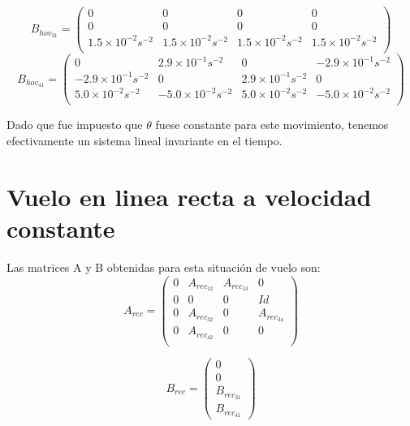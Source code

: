 \documentclass[main]{subfiles}
\begin{document}
\begin{equation}
B_{hov_{31}}=\left(\begin{array}{cccc}
0&0&0&0\\
0&0&0&0\\
1.5\times10^{-2}s^{-2} &1.5\times10^{-2}s^{-2} & 1.5\times10^{-2}s^{-2}& 1.5\times10^{-2}s^{-2} \\
\end{array}\right) 
\end{equation}
\begin{equation}
B_{hov_{41}}=\left(\begin{array}{cccc}
0 & 2.9\times10^{-1}s^{-2} & 0 &-2.9\times10^{-1}s^{-2} \\
-2.9\times10^{-1}s^{-2} &0& 2.9\times10^{-1}s^{-2} &0\\
5.0\times10^{-2}s^{-2} & -5.0\times10^{-2}s^{-2} &5.0\times10^{-2}s^{-2} &-5.0\times10^{-2}s^{-2}\\
\end{array}\right)
\end{equation}

Dado que fue impuesto que $\theta$ fuese constante para este movimiento, tenemos efectivamente un sistema lineal invariante en el tiempo.

\section{Vuelo en linea recta a velocidad constante}

Las matrices A y B obtenidas para esta situaci\'on de vuelo son:
\begin{equation}
\label{eq:Arec}
A_{rec}=\left(\begin{array}{cccc}
0 & A_{rec_{12}} & A_{rec_{13}} & 0 \\
0 & 0 & 0      & Id\\
0 & A_{rec_{32}} & 0 & A_{rec_{34}}\\
0 &  A_{rec_{42}}       &  0  & 0 \\    
\end{array}\right)
\end{equation}

\begin{equation}
\label{eq:Brec}
B_{rec}=\left(\begin{array}{c}
0\\
0\\
B_{rec_{31}}\\
B_{rec_{41}} 
\end{array}\right)
\end{equation}\\
\end{document}
